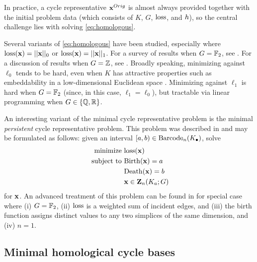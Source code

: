 In practice, a cycle representative $\mathbf{x}^{Orig}$ is almost always provided together with the initial problem data (which consists of $K$, $G$, $\mathrm{loss}$, and $h$), so the central challenge lies with solving \pr \eqref{eq:homologous}.



Several variants of \pr \eqref{eq:homologous} have been studied, especially where $\mathrm{loss}(\mathbf{x}) = ||\mathbf{x}||_0$ or $\mathrm{loss}(\mathbf{x}) = ||\mathbf{x}||_1$.  For a survey of results when $G = \mathbb{F}_2$, see \cite{chenhardness}.  For a discussion of results when $G = \mathbb{Z}$, see \cite{dey2011optimal}.  Broadly  speaking, minimizing against $\ell_0$  tends to be hard, even when $K$ has attractive properties such as embeddability in a low-dimensional Euclidean space \cite{borradaile2020minimum}.  Minimizing against $\ell_1$  is hard when $G = \mathbb{F}_2$ (since, in this case, $\ell_1 = \ell_0$),  but tractable via linear programming when $G \in \{\mathbb{Q}, \mathbb{R}\}$.  


An interesting variant of the minimal cycle representative problem is the minimal \emph{persistent} cycle representative problem.  This problem was described in  \cite{chenquantifying} and may be formulated as follows:  given an interval $[a,b) \in \mathrm{Barcode}_n(K_\bullet)$, solve 
\begin{align}
   \begin{split}
    \text{minimize } & \mathrm{loss}(\mathbf{x}) \\
    \text{ subject to } & \mathrm{Birth}(\mathbf{x}) = a \\
    & \mathrm{Death}(\mathbf{x}) = b \\
    & \mathbf{x} \in \mathbf{Z}_n(K_a; G)
   \end{split}
   \label{eq:minbarcoderep}
\end{align}
for $\mathbf{x}$.  An advanced treatment of this problem can be found in \cite{chenquantifying} for special case where (i)  $G = \mathbb{F}_2$, (ii) $\mathrm{loss}$ is a weighted sum of incident edges,  and (iii) the birth function assigns distinct values to any two simplices of the same dimension, and (iv) $n=1$.  


\subsection{Minimal homological cycle bases}

